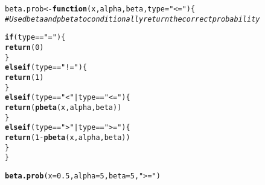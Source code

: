 \documentclass{article}\usepackage[]{graphicx}\usepackage[]{xcolor}
\makeatletter
\newcommand{\hlnum}[1]{\textcolor[rgb]{0.686,0.059,0.569}{#1}}%
\newcommand{\hlsng}[1]{\textcolor[rgb]{0.192,0.494,0.8}{#1}}%
\newcommand{\hlcom}[1]{\textcolor[rgb]{0.678,0.584,0.686}{\textit{#1}}}%
\newcommand{\hlopt}[1]{\textcolor[rgb]{0,0,0}{#1}}%
\newcommand{\hldef}[1]{\textcolor[rgb]{0.345,0.345,0.345}{#1}}%
\newcommand{\hlkwa}[1]{\textcolor[rgb]{0.161,0.373,0.58}{\textbf{#1}}}%
\newcommand{\hlkwb}[1]{\textcolor[rgb]{0.69,0.353,0.396}{#1}}%
\newcommand{\hlkwc}[1]{\textcolor[rgb]{0.333,0.667,0.333}{#1}}%
\newcommand{\hlkwd}[1]{\textcolor[rgb]{0.737,0.353,0.396}{\textbf{#1}}}%
\newenvironment{kframe}{%
 \def\at@end@of@kframe{}%
 \ifinner\ifhmode%
  \def\at@end@of@kframe{\end{minipage}}%
  \begin{minipage}{\columnwidth}%
 \fi\fi%
 \def\FrameCommand##1{\hskip\@totalleftmargin \hskip-\fboxsep
 \colorbox{shadecolor}{##1}\hskip-\fboxsep
     \hskip-\linewidth \hskip-\@totalleftmargin \hskip\columnwidth}%
 \MakeFramed {\advance\hsize-\width
   \@totalleftmargin\z@ \linewidth\hsize
   \@setminipage}}%
 {\par\unskip\endMakeFramed%
 \at@end@of@kframe}
\newenvironment{knitrout}{}{} %
\makeatother
\begin{document}
\begin{enumerate}
\begin{knitrout}\scriptsize
{}\color{fgcolor}\begin{kframe}
\begin{alltt}
\hldef{beta.prob} \hlkwb{<-} \hlkwa{function}\hldef{(}\hlkwc{x}\hldef{,} \hlkwc{alpha}\hldef{,} \hlkwc{beta}\hldef{,} \hlkwc{type}\hldef{=}\hlsng{"<="}\hldef{)\{}
  \hlcom{# Use dbeta and pbeta to conditionally return the correct probability}

  \hlkwa{if} \hldef{(type} \hlopt{==} \hlsng{"="}\hldef{)\{}
    \hlkwd{return}\hldef{(}\hlnum{0}\hldef{)}
  \hldef{\}}
  \hlkwa{else if} \hldef{(type} \hlopt{==} \hlsng{"!="}\hldef{)\{}
    \hlkwd{return}\hldef{(}\hlnum{1}\hldef{)}
  \hldef{\}}
  \hlkwa{else if}\hldef{(type} \hlopt{==} \hlsng{"<"} \hlopt{|} \hldef{type} \hlopt{==} \hlsng{"<="}\hldef{)\{}
    \hlkwd{return}\hldef{(}\hlkwd{pbeta}\hldef{(x, alpha, beta))}
  \hldef{\}}
  \hlkwa{else if} \hldef{(type} \hlopt{==} \hlsng{">"} \hlopt{|} \hldef{type} \hlopt{==} \hlsng{">="}\hldef{)\{}
    \hlkwd{return}\hldef{(}\hlnum{1} \hlopt{-} \hlkwd{pbeta}\hldef{(x, alpha, beta))}
  \hldef{\}}
\hldef{\}}

\hlkwd{beta.prob}\hldef{(}\hlkwc{x} \hldef{=} \hlnum{0.5}\hldef{,} \hlkwc{alpha} \hldef{=} \hlnum{5}\hldef{,} \hlkwc{beta} \hldef{=} \hlnum{5}\hldef{,} \hlsng{">="}\hldef{)}
\end{alltt}
\end{kframe}
\end{knitrout}

\end{enumerate}

\end{document}
